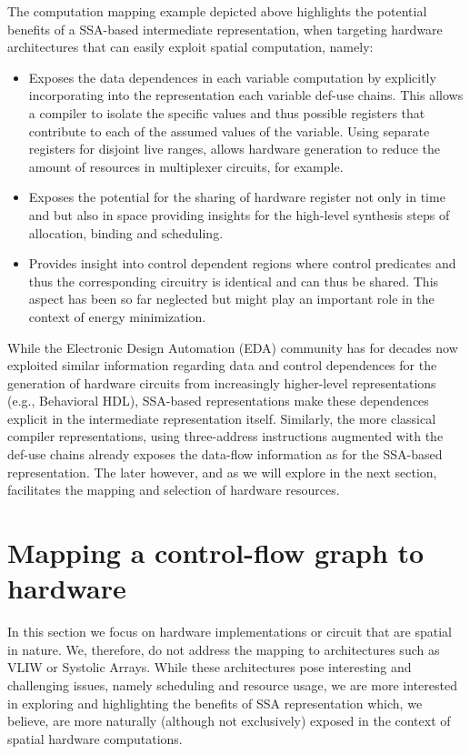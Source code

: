 The computation mapping example depicted above highlights the potential benefits of a SSA-based intermediate representation, when targeting hardware architectures that can easily exploit spatial computation, namely:
\begin{itemize}
\item Exposes the data dependences in each variable computation by explicitly incorporating into the representation each variable def-use chains. 
  This allows a compiler to isolate the specific values and thus possible registers that contribute to each of the assumed values of the variable. 
  Using separate registers for disjoint live ranges, allows hardware generation to reduce the amount of resources in multiplexer circuits, for example.
\item Exposes the potential for the sharing of hardware register not only in time and but also in space providing insights for the high-level synthesis steps of allocation, binding and scheduling.
\item Provides insight into control dependent regions where control predicates and thus the corresponding circuitry is identical and can thus be shared. 
  This aspect has been so far neglected but might play an important role in the context of energy minimization. 
\end{itemize}

While the Electronic Design Automation (EDA) community has for decades now exploited similar information regarding data and control dependences for the generation of hardware circuits from increasingly higher-level representations (e.g., Behavioral HDL), SSA-based representations make these dependences explicit in the intermediate representation itself.  Similarly, the more classical compiler representations, using three-address instructions augmented with the def-use chains already exposes the data-flow information as for the SSA-based representation. The later however, and as we will explore in the next section, facilitates the mapping and selection of hardware resources.


\section{Mapping a control-flow graph to hardware}
In this section we focus on hardware implementations or circuit that are spatial in nature.
We, therefore, do not address the mapping to architectures such as VLIW or Systolic Arrays. 
While these architectures pose interesting and challenging issues, namely scheduling and resource usage, we are more interested in exploring and highlighting the benefits of SSA representation which, we believe, are more naturally (although not exclusively) exposed in the context of spatial hardware computations.

